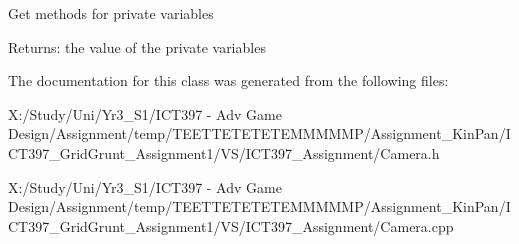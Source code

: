 Get methods for private variables \begin{Desc}
\item[Returns:]the value of the private variables \end{Desc}


The documentation for this class was generated from the following files:\begin{CompactItemize}
\item 
X:/Study/Uni/Yr3\_\-S1/ICT397 - Adv Game Design/Assignment/temp/TEETTETETETEMMMMMP/Assignment\_\-KinPan/ICT397\_\-GridGrunt\_\-Assignment1/VS/ICT397\_\-Assignment/Camera.h\item 
X:/Study/Uni/Yr3\_\-S1/ICT397 - Adv Game Design/Assignment/temp/TEETTETETETEMMMMMP/Assignment\_\-KinPan/ICT397\_\-GridGrunt\_\-Assignment1/VS/ICT397\_\-Assignment/Camera.cpp\end{CompactItemize}
